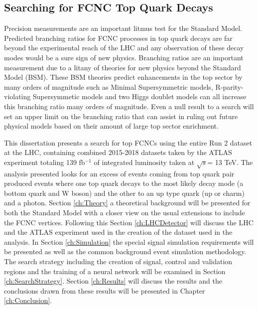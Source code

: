 \subsection{Searching for FCNC Top Quark Decays}
Precision measurements are an important litmus test for the Standard Model.  Predicted branching ratios for FCNC processes in top quark decays are far beyond the experimental reach of the LHC and any observation of these decay modes would be a sure sign of new physics.  Branching ratios are an important measurement due to a litany of theories for new physics beyond the Standard Model (BSM).  These BSM theories predict enhancements in the top sector by many orders of magnitude such as Minimal Supersymmetric models\cite{MSSM}, R-parity-violating Supersymmetic models\cite{RPVSUSY} and two Higgs doublet models\cite{2HDM} can all increase this branching ratio many orders of magnitude.  Even a null result to a search will set an upper limit on the branching ratio that can assist in ruling out future physical models based on their amount of large top sector enrichment.

This dissertation presents a search for top FCNCs using the entire Run 2 dataset at the LHC, containing combined 2015-2018 datasets taken by the ATLAS experiment totaling 139 fb$^{-1}$ of integrated luminosity taken at $\sqrt{s}$= 13 TeV.  The analysis presented looks for an excess of events coming from top quark pair produced events where one top quark decays to the most likely decay mode (a bottom quark and W boson) and the other to an up type quark (up or charm) and a photon. Section \ref{ch:Theory} a theoretical background will be presented for both the Standard Model with a closer view on the usual extensions to include the FCNC vertices.  Following this  Section \ref{ch:LHCDetector} will discuss the LHC and the ATLAS experiment used in the creation of the dataset used in the analysis.  In Section \ref{ch:Simulation} the special signal simulation requirements will be presented as well as the common background event simulation methodology.  The search strategy including the creation of signal, control and validation regions and the training of a neural network will be examined in Section \ref{ch:SearchStrategy}.  Section \ref{ch:Results} will discuss the results and the conclusions drawn from these results will be presented in Chapter \ref{ch:Conclusion}.
